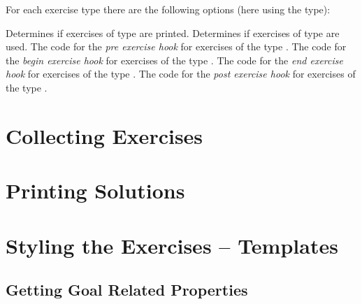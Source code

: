 \documentclass[load-preamble+]{cnltx-doc}
\begin{document}
For each exercise type there are the following options (here using the
 type):
\begin{options}
    Determines if exercises of type  are printed.
    Determines if exercises of type  are used.
  \Default
    The code for the \emph{pre exercise hook} for exercises of the type
    .
  \Default
    The code for the \emph{begin exercise hook} for exercises of the type
    .
  \Default
    The code for the \emph{end exercise hook} for exercises of the type
    .
  \Default
    The code for the \emph{post exercise hook} for exercises of the type
    .
\end{options}

\section{Collecting Exercises}\label{sec:collecting-exercises}

\section{Printing Solutions}\label{sec:printing-solutions}

\section{Styling the Exercises -- Templates}\label{sec:styl-exerc-templ}

\subsection{Getting Goal Related Properties}
\end{document}
